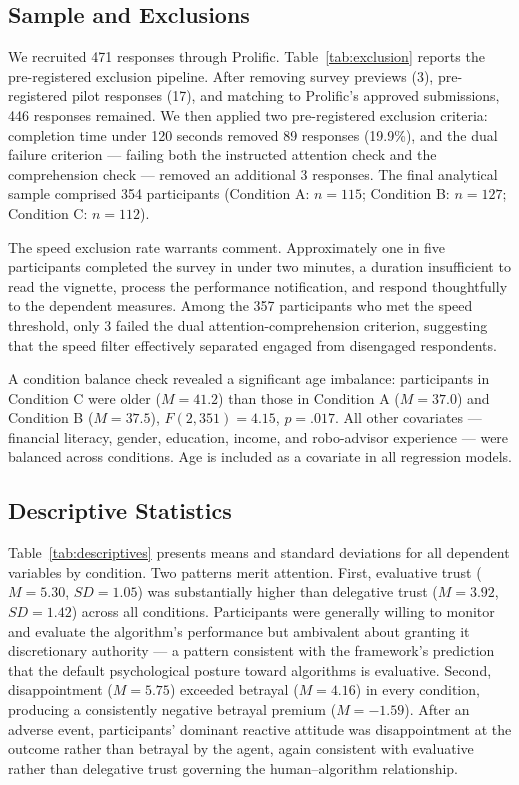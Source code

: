 
\subsection{Sample and Exclusions}

We recruited 471 responses through Prolific. Table~\ref{tab:exclusion} reports the pre-registered exclusion pipeline. After removing survey previews (3), pre-registered pilot responses (17), and matching to Prolific's approved submissions, 446 responses remained. We then applied two pre-registered exclusion criteria: completion time under 120 seconds removed 89 responses (19.9\%), and the dual failure criterion --- failing both the instructed attention check and the comprehension check --- removed an additional 3 responses. The final analytical sample comprised 354 participants (Condition A: $n = 115$; Condition B: $n = 127$; Condition C: $n = 112$).



The speed exclusion rate warrants comment. Approximately one in five participants completed the survey in under two minutes, a duration insufficient to read the vignette, process the performance notification, and respond thoughtfully to the dependent measures. Among the 357 participants who met the speed threshold, only 3 failed the dual attention-comprehension criterion, suggesting that the speed filter effectively separated engaged from disengaged respondents.

A condition balance check revealed a significant age imbalance: participants in Condition C were older ($M = 41.2$) than those in Condition A ($M = 37.0$) and Condition B ($M = 37.5$), $F(2, 351) = 4.15$, $p = .017$. All other covariates --- financial literacy, gender, education, income, and robo-advisor experience --- were balanced across conditions. Age is included as a covariate in all regression models.

\subsection{Descriptive Statistics}



Table~\ref{tab:descriptives} presents means and standard deviations for all dependent variables by condition. Two patterns merit attention. First, evaluative trust ($M = 5.30$, $SD = 1.05$) was substantially higher than delegative trust ($M = 3.92$, $SD = 1.42$) across all conditions. Participants were generally willing to monitor and evaluate the algorithm's performance but ambivalent about granting it discretionary authority --- a pattern consistent with the framework's prediction that the default psychological posture toward algorithms is evaluative. Second, disappointment ($M = 5.75$) exceeded betrayal ($M = 4.16$) in every condition, producing a consistently negative betrayal premium ($M = -1.59$). After an adverse event, participants' dominant reactive attitude was disappointment at the outcome rather than betrayal by the agent, again consistent with evaluative rather than delegative trust governing the human--algorithm relationship.

